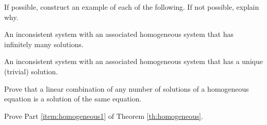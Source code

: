 \documentclass{ximera}
\begin{document}
\begin{problem} If possible, construct an example of each of the following.  If not possible, explain why.
  \begin{problem}
  An inconsistent system with an associated homogeneous system that has infinitely many solutions.
  \end{problem}
  \begin{problem}
  An inconsistent system with an associated homogeneous system that has a unique (trivial) solution.
  \end{problem}
\end{problem}

\begin{problem}
Prove that a linear combination of any number of solutions of a homogeneous equation is a solution of the same equation.
\end{problem}

\begin{problem} Prove Part \ref{item:homogeneous1} of Theorem \ref{th:homogeneous}.
\end{problem}
\end{document}
